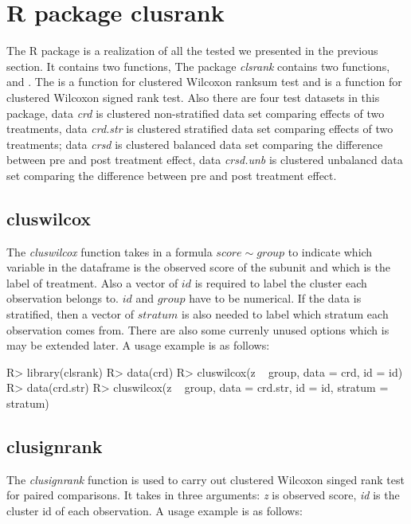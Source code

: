 \documentclass[article]{jss}
\begin{document}
\section{R package clusrank}
The R package is a realization of all the tested we presented in the previous section. It contains two functions, 
The package \emph{clsrank} contains two functions, 
and . The  is a function for
clustered Wilcoxon ranksum test and  is a function
for clustered Wilcoxon signed rank test. Also there are four test
datasets in this package, data \emph{crd} is clustered non-stratified
data set comparing effects of two treatments, data \emph{crd.str} is
clustered stratified data set comparing effects of two treatments; data
\emph{crsd} is clustered balanced data set comparing the difference
between pre and post treatment effect, data \emph{crsd.unb} is clustered
unbalancd data set comparing the difference between pre and post
treatment effect.

\subsection{cluswilcox}\label{cluswilcox}

The \emph{cluswilcox} function takes in a formula \(score \sim group\)
to indicate which variable in the dataframe is the observed score of the
subunit and which is the label of treatment. Also a vector of \(id\) is
required to label the cluster each observation belongs to. \(id\) and
\(group\) have to be numerical. If the data is stratified, then a vector
of \(stratum\) is also needed to label which stratum each observation
comes from. There are also some currenly unused options which is may be
extended later. A usage example is as follows:

\begin{CodeChunk} 
\begin{CodeInput}
R> library(clsrank)
R> data(crd)
R> cluswilcox(z ~ group, data = crd, id = id)
R> data(crd.str)
R> cluswilcox(z ~ group, data = crd.str, id = id, stratum = stratum)
\end{CodeInput}
\end{CodeChunk}

\subsection{clusignrank}\label{clusignrank}

The \emph{clusignrank} function is used to carry out clustered Wilcoxon
singed rank test for paired comparisons. It takes in three arguments:
\emph{z} is observed score, \emph{id} is the cluster id of each
observation. A usage example is as follows:
\end{document}
